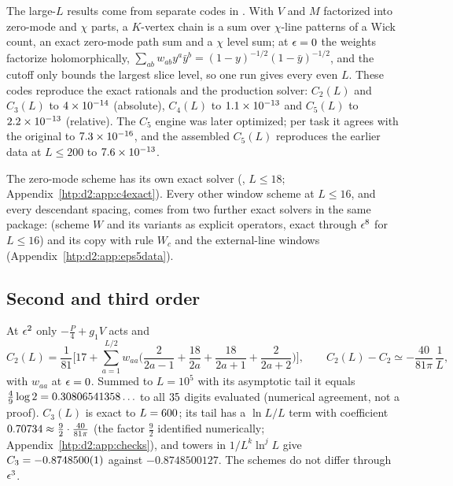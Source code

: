 The large-$L$ results come from separate codes in . With $V$ and $M$ factorized
into zero-mode and $\chi$ parts, a $K$-vertex chain is a sum over $\chi$-line patterns of a Wick count, an exact zero-mode
path sum and a $\chi$ level sum; at $\epsilon=0$ the weights factorize holomorphically, $\sum_{ab}w_{ab}y^a\bar y^b=(1-y)^{-1/2}(1-\bar
y)^{-1/2}$, and the cutoff only bounds the largest slice level, so one run gives every even $L$. These codes reproduce the exact
rationals and the production solver: $C_2(L)$ and $C_3(L)$ to $4\times10^{-14}$ (absolute), $C_4(L)$ to $1.1\times10^{-13}$ and
$C_5(L)$ to $2.2\times10^{-13}$ (relative). The $C_5$ engine was later optimized; per task it agrees with the original to $7.3\times10^{-16}$,
and the assembled $C_5(L)$ reproduces the earlier data at $L\le200$ to $7.6\times10^{-13}$.

The zero-mode scheme has its own exact solver (, $L\le18$; Appendix~\ref{htp:d2:app:c4exact}). Every
other window scheme at $L\le16$, and every descendant spacing, comes from two further exact solvers in the same package:  (scheme $W$ and its variants as explicit operators, exact through
$\epsilon^8$ for $L\le16$) and its copy  with rule $W_c$ and the external-line windows
(Appendix~\ref{htp:d2:app:eps5data}).

\subsection{Second and third order}\label{htp:d2:low}
At $\epsilon^2$ only $-\frac P4+g_1V$ acts and
\begin{equation}
 C_2(L)=\frac1{81}\Big[17+\sum_{a=1}^{L/2}w_{aa}\Big(\frac2{2a-1}+\frac{18}{2a}+\frac{18}{2a+1}+\frac2{2a+2}\Big)\Big],\qquad
 C_2(L)-C_2\simeq-\frac{40}{81\pi}\,\frac1L ,
 \label{htp:d2:eq:C2}
\end{equation}
with $w_{aa}$ at $\epsilon=0$. Summed to $L=10^5$ with its asymptotic tail it equals $\frac49\log2=0.30806541358\ldots$ to all
$35$ digits evaluated (numerical agreement, not a proof). $C_3(L)$ is exact to $L=600$; its tail
has a $\ln L/L$ term with coefficient $0.70734\approx\frac92\cdot\frac{40}{81\pi}$ (the factor $\frac92$ identified
numerically; Appendix~\ref{htp:d2:app:checks}), and towers in $1/L^k\ln^jL$ give
$C_3=-0.8748500(1)$ against $-0.8748500127$. The schemes do not differ through $\epsilon^3$.

